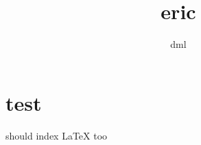 \documentclass[a4paper,10pt]{article}
\title{eric}
\author{dml}
\begin{document}
\maketitle

\begin{abstract}

\end{abstract}

\section{test}
should index LaTeX too
\end{document}
